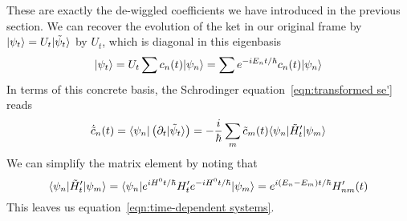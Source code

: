 These are exactly the de-wiggled coefficients we have introduced in the previous section. 
We can recover the evolution of the ket in our original frame by 
$|\psi_t\rangle = U_t|\tilde \psi_t\rangle$ by $U_t$, which 
is diagonal in this eigenbasis 
\[ 
    |\psi_t\rangle = U_t \sum c_n(t)|\psi_n\rangle  = \sum e^{-iE_nt/\hbar} c_n(t)|\psi_n\rangle 
\] 
In terms of this concrete basis, the Schrodinger equation~\ref{eqn:transformed se'} reads 
\[ 
    \dot {\tilde c}_n(t) = \langle \psi_n| \left(\partial_{t} |\tilde \psi_t\rangle \right)
    = -\dfrac i {\hbar} \sum_m \tilde c_m(t) \langle \psi_n|\tilde H'_t|\psi_m\rangle 
\] 
We can simplify the matrix element by noting that 
\[ 
    \langle \psi_n|\tilde H'_t|\psi_m\rangle = \langle \psi_n|e^{iH^0t/\hbar}H'_te^{-iH^0t/\hbar}|\psi_m\rangle 
    = e^{i(E_n - E_m)t/\hbar} H'_{nm}(t)
\] 
This leaves us equation~\ref{eqn:time-dependent systems}. 
